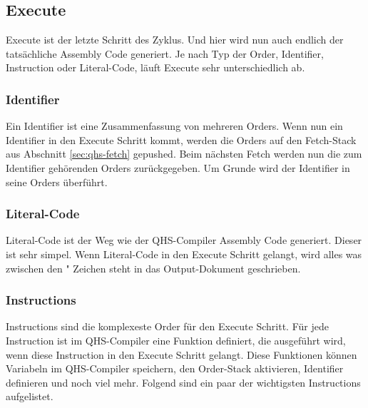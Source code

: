 \subsection{Execute} \label{sec:qhs-execute}
Execute ist der letzte Schritt des Zyklus. Und hier wird nun auch endlich der tatsächliche Assembly Code generiert. Je nach Typ der Order, Identifier, Instruction oder Literal-Code, läuft Execute sehr unterschiedlich ab.

\subsubsection{Identifier}
Ein Identifier ist eine Zusammenfassung von mehreren Orders. Wenn nun ein Identifier in den Execute Schritt kommt, werden die Orders auf den Fetch-Stack aus Abschnitt \ref{sec:qhs-fetch} gepushed.
Beim nächsten Fetch werden nun die zum Identifier gehörenden Orders zurückgegeben. Um Grunde wird der Identifier in seine Orders überführt.

\subsubsection{Literal-Code}
Literal-Code ist der Weg wie der QHS-Compiler Assembly Code generiert. Dieser ist sehr simpel. Wenn Literal-Code in den Execute Schritt gelangt, wird alles was zwischen den " Zeichen steht in das Output-Dokument geschrieben.

\subsubsection{Instructions}
Instructions sind die komplexeste Order für den Execute Schritt. Für jede Instruction ist im QHS-Compiler eine Funktion definiert, die ausgeführt wird, wenn diese Instruction in den Execute Schritt gelangt.
Diese Funktionen können Variabeln im QHS-Compiler speichern, den Order-Stack aktivieren, Identifier definieren und noch viel mehr. Folgend sind ein paar der wichtigsten Instructions aufgelistet.

